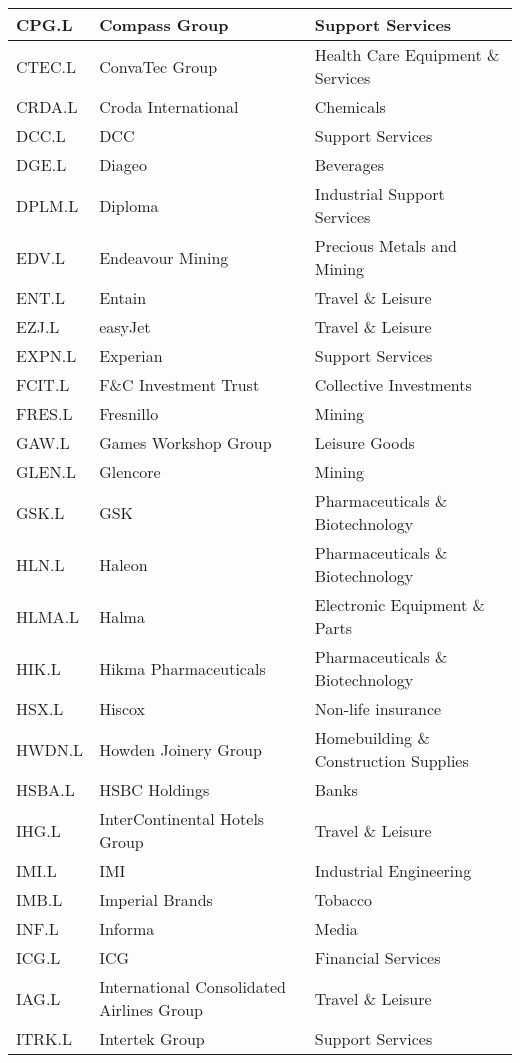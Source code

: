 \begin{longtable}{|p{2cm}|p{4cm}|p{6cm}|}
CPG.L & Compass Group & Support Services \\ \hline
CTEC.L & ConvaTec Group & Health Care Equipment \& Services \\ \hline
CRDA.L & Croda International & Chemicals \\ \hline
DCC.L & DCC & Support Services \\ \hline
DGE.L & Diageo & Beverages \\ \hline
DPLM.L & Diploma & Industrial Support Services \\ \hline
EDV.L & Endeavour Mining & Precious Metals and Mining \\ \hline
ENT.L & Entain & Travel \& Leisure \\ \hline
EZJ.L & easyJet & Travel \& Leisure \\ \hline
EXPN.L & Experian & Support Services \\ \hline
FCIT.L & F\&C Investment Trust & Collective Investments \\ \hline
FRES.L & Fresnillo & Mining \\ \hline
GAW.L & Games Workshop Group & Leisure Goods \\ \hline
GLEN.L & Glencore & Mining \\ \hline
GSK.L & GSK & Pharmaceuticals \& Biotechnology \\ \hline
HLN.L & Haleon & Pharmaceuticals \& Biotechnology \\ \hline
HLMA.L & Halma & Electronic Equipment \& Parts \\ \hline
HIK.L & Hikma Pharmaceuticals & Pharmaceuticals \& Biotechnology \\ \hline
HSX.L & Hiscox & Non-life insurance \\ \hline
HWDN.L & Howden Joinery Group & Homebuilding \& Construction Supplies \\ \hline
HSBA.L & HSBC Holdings & Banks \\ \hline
IHG.L & InterContinental Hotels Group & Travel \& Leisure \\ \hline
IMI.L & IMI & Industrial Engineering \\ \hline
IMB.L & Imperial Brands & Tobacco \\ \hline
INF.L & Informa & Media \\ \hline
ICG.L & ICG & Financial Services \\ \hline
IAG.L & International Consolidated Airlines Group & Travel \& Leisure \\ \hline
ITRK.L & Intertek Group & Support Services \\ \hline

\end{longtable}

